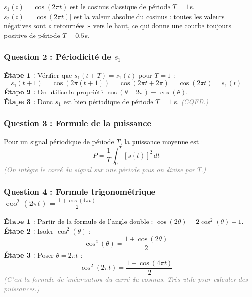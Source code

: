 \documentclass[12pt,a4paper]{article}
\newcommand{\step}[1]{\textcolor{coursbleu}{\textbf{Étape #1 :}}}
\newcommand{\explication}[1]{\textit{\textcolor{gray}{(#1)}}}
\begin{document}
\begin{tcolorbox}[corrbox, title=Correction Q1]
$s_1(t) = \cos(2\pi t)$ est le cosinus classique de période $T=1$\,s.\\
$s_2(t) = |\cos(2\pi t)|$ est la valeur absolue du cosinus : toutes les valeurs négatives
sont « retournées » vers le haut, ce qui donne une courbe toujours positive de période $T=0.5$\,s.
\end{tcolorbox}

\subsubsection*{Question 2 : Périodicité de $s_1$}

\begin{tcolorbox}[corrbox, title=Correction Q2]
\step{1} Vérifier que $s_1(t+T) = s_1(t)$ pour $T=1$ :
\[
  s_1(t+1) = \cos(2\pi(t+1)) = \cos(2\pi t + 2\pi) = \cos(2\pi t) = s_1(t)
\]
\step{2} On utilise la propriété $\cos(\theta + 2\pi) = \cos(\theta)$.\\[3pt]
\step{3} Donc $s_1$ est bien périodique de période $T = 1$ s. \quad \explication{CQFD.}
\end{tcolorbox}

\subsubsection*{Question 3 : Formule de la puissance}

\begin{tcolorbox}[corrbox, title=Correction Q3]
Pour un signal périodique de période $T$, la puissance moyenne est :
\[
  P = \frac{1}{T}\int_0^T [s(t)]^2\,dt
\]
\explication{On intègre le carré du signal sur une période puis on divise par $T$.}
\end{tcolorbox}

\subsubsection*{Question 4 : Formule trigonométrique $\cos^2(2\pi t) = \frac{1 + \cos(4\pi t)}{2}$}

\begin{tcolorbox}[corrbox, title=Correction Q4]
\step{1} Partir de la formule de l'angle double : $\cos(2\theta) = 2\cos^2(\theta) - 1$.\\[4pt]
\step{2} Isoler $\cos^2(\theta)$ :
\[
  \cos^2(\theta) = \frac{1 + \cos(2\theta)}{2}
\]
\step{3} Poser $\theta = 2\pi t$ :
\[
  \cos^2(2\pi t) = \frac{1 + \cos(4\pi t)}{2}
\]
\explication{C'est la formule de linéarisation du carré du cosinus. Très utile pour calculer des puissances.}
\end{tcolorbox}
\end{document}
